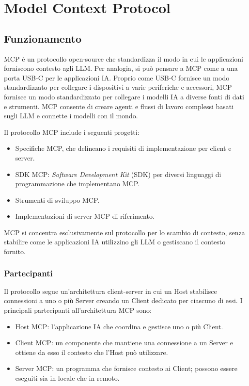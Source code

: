\chapter{Model Context Protocol}

\section{Funzionamento}

MCP è un protocollo open-source che standardizza il modo in cui le applicazioni forniscono contesto agli LLM. Per analogia, si può pensare a MCP 
come a una porta USB-C per le applicazioni IA. Proprio come USB-C fornisce un modo standardizzato per collegare i dispositivi a varie periferiche 
e accessori, MCP fornisce un modo standardizzato per collegare i modelli IA a diverse fonti di dati e strumenti. MCP consente di creare agenti e 
flussi di lavoro complessi basati sugli LLM e connette i modelli con il mondo. 
\cite{modelcontextprotocol2024intro}

Il protocollo MCP include i seguenti progetti:
\begin{itemize}
\item Specifiche MCP, che delineano i requisiti di implementazione per client e server.
\item SDK MCP: \textit{Software Development Kit} (SDK) per diversi linguaggi di programmazione che implementano MCP.
\item Strumenti di sviluppo MCP.
\item Implementazioni di server MCP di riferimento.
\end{itemize}
MCP si concentra esclusivamente sul protocollo per lo scambio di contesto, senza stabilire come le applicazioni IA utilizzino gli LLM o gestiscano il contesto fornito.
\cite{modelcontextprotocol2024arch}

\subsection{Partecipanti}
Il protocollo segue un'architettura client-server in cui un Host stabilisce connessioni a uno o più Server creando un Client dedicato per ciascuno
di essi. I principali partecipanti all'architettura MCP sono:
\begin{itemize}
\item Host MCP: l'applicazione IA che coordina e gestisce uno o più Client.
\item Client MCP: un componente che mantiene una connessione a un Server e ottiene da esso il contesto che l'Host può utilizzare.
\item Server MCP: un programma che fornisce contesto ai Client; possono essere eseguiti sia in locale che in remoto.
\cite{modelcontextprotocol2024arch}
\end{itemize}

